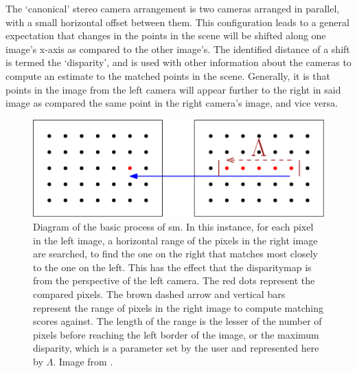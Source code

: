 The `canonical' stereo camera arrangement is two cameras arranged in parallel, with a small horizontal offset between them.  This configuration leads to a general expectation that changes in the points in the scene will be shifted along one image's x-axis as compared to the other image's.  The identified distance of a shift is termed the `\gls{disparity}', and is used with other information about the cameras to compute an estimate to the matched points in the scene.  Generally, it is  that points in the image from the left camera will appear further to the right in said image as compared the same point in the right camera's image, and vice versa.

\begin{figure}
    \centering
    \includegraphics[width=1.0\textwidth]{chapters/litreview/images/stereo_matching-eps-converted-to.pdf}
    \caption{Diagram of the basic process of \gls{sm}. In this instance, for each pixel in the left image, a horizontal range of the pixels in the right image are searched, to find the one on the right that matches most closely to the one on the left. This has the effect that the \gls{disparitymap} is from the perspective of the left camera. The red dots represent the compared pixels. The brown dashed arrow and vertical bars represent the range of pixels in the right image to compute matching scores against. The length of the range is the lesser of the number of pixels before reaching the left border of the image, or the maximum \gls{disparity}, which is a parameter set by the user and represented here by \(\Lambda\).  Image from \cite{bsmpcvpic}.}
    \label{fig:stereomatchingbasic}
\end{figure}


